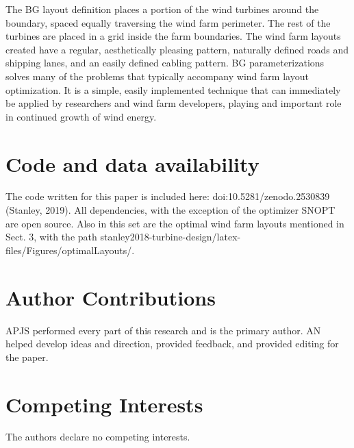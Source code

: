 \documentclass[wes, manuscript]{copernicus}
\begin{document}
The BG layout definition places a portion of the wind turbines around the boundary, spaced equally traversing the wind farm perimeter. The rest of the turbines are placed in a grid inside the farm boundaries. The wind farm layouts created have a regular, aesthetically pleasing pattern, naturally defined roads and shipping lanes, and an easily defined cabling pattern. 
%
BG parameterizations solves many of the problems that typically accompany wind farm layout optimization. It is a simple, easily implemented technique that can immediately be applied by researchers and wind farm developers, playing and important role in continued growth of wind energy.

\section*{Code and data availability}
The code written for this paper is included here: doi:10.5281/zenodo.2530839 (Stanley, 2019). All dependencies, with the exception of the optimizer SNOPT are open source. Also in this set are the optimal wind farm layouts mentioned in Sect. 3, with the path stanley2018-turbine-design/latex-files/Figures/optimalLayouts/.

\section*{Author Contributions}
APJS performed every part of this research and is the
primary author. AN helped develop ideas and direction, provided
feedback, and provided editing for the paper.

\section*{Competing Interests}
The authors declare no competing interests.





\end{document}
